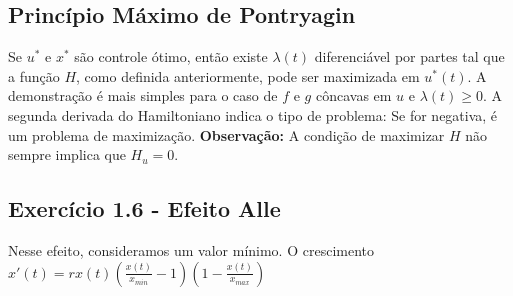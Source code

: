 \subsection{Princípio Máximo de Pontryagin}

Se $u^*$ e $x^*$ são controle ótimo, então existe $\lambda (t)$ diferenciável por partes tal que a função $H$, como definida anteriormente, pode ser maximizada em $u^*(t)$. A demonstração é mais simples para o caso de $f$ e $g$ côncavas em $u$ e $\lambda (t) \geq 0$. A segunda derivada do Hamiltoniano indica o tipo de problema: Se for negativa, é um problema de maximização. 
\textbf{Observação:} A condição de maximizar $H$ não sempre implica que $H_u = 0$.  

\subsection{Exercício 1.6 - Efeito Alle}

Nesse efeito, consideramos um valor mínimo. O crescimento $x'(t) = rx(t)(\frac{x(t)}{x_{min}} - 1)(1 - \frac{x(t)}{x_{max}})$

